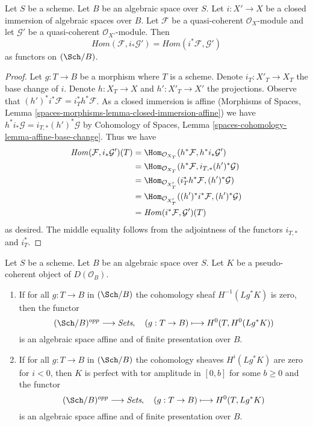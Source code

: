 \begin{lemma}
\label{lemma-hom-closed}
Let $S$ be a scheme. Let $B$ be an algebraic space over $S$.
Let $i : X' \to X$ be a closed immersion of algebraic spaces
over $B$. Let $\mathcal{F}$ be a quasi-coherent $\mathcal{O}_X$-module
and let $\mathcal{G}'$ be a quasi-coherent $\mathcal{O}_{X'}$-module.
Then
$$
\mathit{Hom}(\mathcal{F}, i_*\mathcal{G}') =
\mathit{Hom}(i^*\mathcal{F}, \mathcal{G}')
$$
as functors on $(\Sch/B)$.
\end{lemma}

\begin{proof}
Let $g : T \to B$ be a morphism where $T$ is a scheme.
Denote $i_T : X'_T \to X_T$ the base change of $i$.
Denote $h : X_T \to X$ and $h' : X'_T \to X'$ the projections.
Observe that $(h')^*i^*\mathcal{F} = i_T^*h^*\mathcal{F}$.
As a closed immersion is affine
(Morphisms of Spaces, Lemma
\ref{spaces-morphisms-lemma-closed-immersion-affine})
we have $h^*i_*\mathcal{G} = i_{T, *}(h')^*\mathcal{G}$ by
Cohomology of Spaces, Lemma \ref{spaces-cohomology-lemma-affine-base-change}.
Thus we have
\begin{align*}
\mathit{Hom}(\mathcal{F}, i_*\mathcal{G}')(T)
& =
\Hom_{\mathcal{O}_{X_T}}(h^*\mathcal{F}, h^*i_*\mathcal{G}') \\
& =
\Hom_{\mathcal{O}_{X_T}}(h^*\mathcal{F}, i_{T, *}(h')^*\mathcal{G}) \\
& =
\Hom_{\mathcal{O}_{X'_T}}(i_T^*h^*\mathcal{F}, (h')^*\mathcal{G}) \\
& =
\Hom_{\mathcal{O}_{X'_T}}((h')^*i^*\mathcal{F}, (h')^*\mathcal{G}) \\
& =
\mathit{Hom}(i^*\mathcal{F}, \mathcal{G}')(T)
\end{align*}
as desired. The middle equality follows from the adjointness of the functors
$i_{T, *}$ and $i_T^*$.
\end{proof}

\begin{lemma}
\label{lemma-cohomology-perfect-complex}
Let $S$ be a scheme. Let $B$ be an algebraic space over $S$.
Let $K$ be a pseudo-coherent object of $D(\mathcal{O}_B)$.
\begin{enumerate}
\item If for all $g : T \to B$ in $(\Sch/B)$ the cohomology sheaf
$H^{-1}(Lg^*K)$ is zero, then the functor
$$
(\Sch/B)^{opp} \longrightarrow \textit{Sets},\quad
(g : T \to B) \longmapsto H^0(T, H^0(Lg^*K))
$$
is an algebraic space affine and of finite presentation over $B$.
\item If for all $g : T \to B$ in $(\Sch/B)$ the cohomology sheaves
$H^i(Lg^*K)$ are zero for $i < 0$, then $K$ is perfect with tor amplitude
in $[0, b]$ for some $b \geq 0$ and the functor
$$
(\Sch/B)^{opp} \longrightarrow \textit{Sets},\quad
(g : T \to B) \longmapsto H^0(T, Lg^*K)
$$
is an algebraic space affine and of finite presentation over $B$.
\end{enumerate}
\end{lemma}

